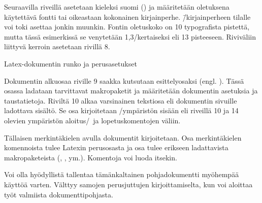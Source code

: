 Seuraavilla riveillä asetetaan kieleksi suomi () ja
määritetään oletuksena käytettävä fontti tai oikeastaan kokonainen
kirjainperhe.  \=/kirjainperheen tilalle
voi toki asettaa jonkin muunkin. Fontin oletuskoko on 10 typografista
pistettä, mutta tässä esimerkissä se venytetään 1,3\-/kertaiseksi eli 13
pisteeseen. Riviväliin liittyvä kerroin asetetaan rivillä 8.

\begin{esimerkki*}

\caption{Latex-dokumentin runko ja perusasetukset}
\label{esim:ensimmainen}
\end{esimerkki*}

Dokumentin alkuosaa riville 9 saakka kutsutaan esittelyosaksi (engl.
). Tässä osassa ladataan tarvittavat makropaketit ja
määritetään dokumentin asetuksia ja taustatietoja. Riviltä 10 alkaa
varsinainen tekstiosa eli dokumentin sivuille ladottava sisältö. Se osa
kirjoitetaan \-/ympäristön sisään eli riveillä 10
ja 14 olevien ympäristön aloitus\-/\ ja lopetuskomentojen väliin.

Tällaisen merkintäkielen avulla dokumentit kirjoitetaan. Osa
merkintäkielen komennoista tulee Latexin perusosasta ja osa tulee
erikseen ladattavista makropaketeista (,
,  ym.). Komentoja voi luoda
itsekin.

Voi olla hyödyllistä tallentaa tämänkaltainen pohjadokumentti myöhempää
käyttöä varten. Välttyy samojen perusjuttujen kirjoittamiselta, kun voi
aloittaa työt valmiista dokumenttipohjasta.
